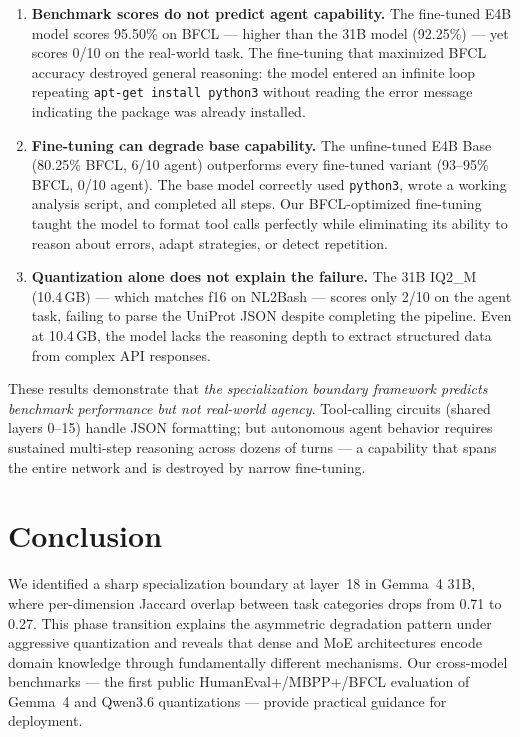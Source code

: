 \documentclass[11pt,a4paper]{article}
\begin{document}
\begin{enumerate}[leftmargin=*,itemsep=2pt]
\item \textbf{Benchmark scores do not predict agent capability.} The fine-tuned E4B model scores 95.50\% on BFCL --- higher than the 31B model (92.25\%) --- yet scores 0/10 on the real-world task. The fine-tuning that maximized BFCL accuracy destroyed general reasoning: the model entered an infinite loop repeating \texttt{apt-get install python3} without reading the error message indicating the package was already installed.

\item \textbf{Fine-tuning can degrade base capability.} The unfine-tuned E4B Base (80.25\% BFCL, 6/10 agent) outperforms every fine-tuned variant (93--95\% BFCL, 0/10 agent). The base model correctly used \texttt{python3}, wrote a working analysis script, and completed all steps. Our BFCL-optimized fine-tuning taught the model to format tool calls perfectly while eliminating its ability to reason about errors, adapt strategies, or detect repetition.

\item \textbf{Quantization alone does not explain the failure.} The 31B IQ2\_M (10.4\,GB) --- which matches f16 on NL2Bash --- scores only 2/10 on the agent task, failing to parse the UniProt JSON despite completing the pipeline. Even at 10.4\,GB, the model lacks the reasoning depth to extract structured data from complex API responses.
\end{enumerate}

These results demonstrate that \emph{the specialization boundary framework predicts benchmark performance but not real-world agency}. Tool-calling circuits (shared layers 0--15) handle JSON formatting; but autonomous agent behavior requires sustained multi-step reasoning across dozens of turns --- a capability that spans the entire network and is destroyed by narrow fine-tuning.

\section{Conclusion}

We identified a sharp specialization boundary at layer~18 in Gemma~4 31B, where per-dimension Jaccard overlap between task categories drops from 0.71 to 0.27. This phase transition explains the asymmetric degradation pattern under aggressive quantization and reveals that dense and MoE architectures encode domain knowledge through fundamentally different mechanisms. Our cross-model benchmarks --- the first public HumanEval+/MBPP+/BFCL evaluation of Gemma~4 and Qwen3.6 quantizations --- provide practical guidance for deployment.
\end{document}
